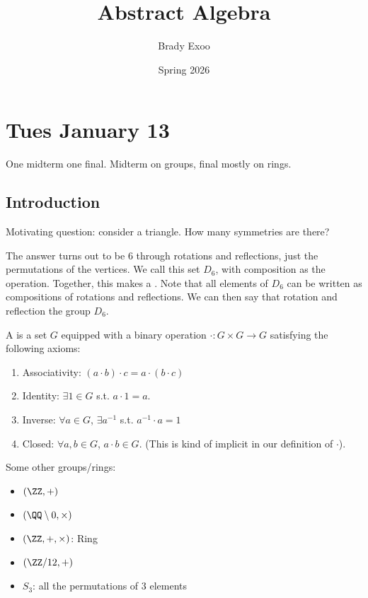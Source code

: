 \documentclass{article}
\begin{document}
\title{Abstract Algebra} %
\author{Brady Exoo} %
\date{Spring 2026} %
\maketitle

\tableofcontents

\eject

\section{Tues January 13}
One midterm one final. Midterm on groups, final mostly on rings.
\subsection{Introduction}
Motivating question: consider a triangle. How many symmetries are there?

The answer turns out to be $6$ through rotations and reflections, just the permutations of the vertices. We call this set $D_6$, with composition as the operation. Together, this makes a .
Note that all elements of $D_6$ can be written as compositions of rotations and reflections. We can then say that rotation and reflection  the group $D_6$.
\begin{definition}
  A  is a set $G$ equipped with a binary operation $\cdot: G \times G \to G$ satisfying the following axioms:
  \begin{enumerate}
  \item Associativity: $(a \cdot b) \cdot c = a \cdot (b \cdot c)$
  \item Identity: $\exists 1 \in G$ s.t. $a \cdot 1 = a$.
  \item Inverse: $\forall a \in G$, $\exists a^{-1}$ s.t. $a^{-1} \cdot a = 1$
  \item Closed: $\forall a,b \in G$, $a \cdot b \in G$. (This is kind of implicit in our definition of $\cdot$).
  \end{enumerate}
\end{definition}
Some other groups/rings:
\begin{itemize}
\item $(\ZZ, +)$ 
\item $(\QQ \setminus 0, \times)$
\item $(\ZZ, +, \times)$: Ring
\item $(\ZZ/12, +)$
\item $S_3$: all the permutations of $3$ elements
\end{itemize}
\end{document}
